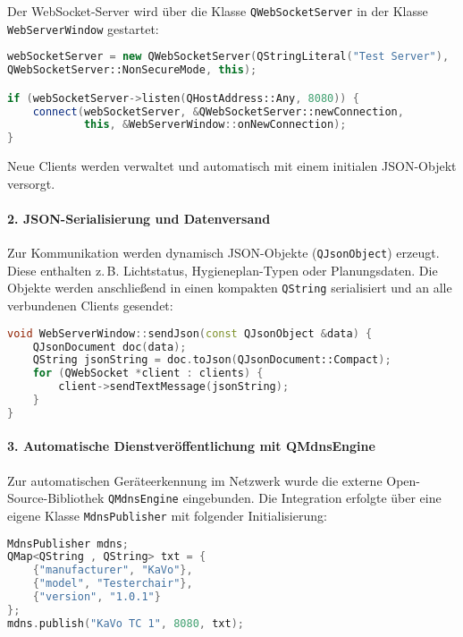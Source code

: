 Der WebSocket-Server wird über die Klasse \texttt{QWebSocketServer} in der Klasse \texttt{WebServerWindow} gestartet:

\begin{lstlisting}[language=C++,caption={Starten des WebSocket-Servers},label={lst:websocket-server}]
webSocketServer = new QWebSocketServer(QStringLiteral("Test Server"),
QWebSocketServer::NonSecureMode, this);

if (webSocketServer->listen(QHostAddress::Any, 8080)) {
    connect(webSocketServer, &QWebSocketServer::newConnection,
            this, &WebServerWindow::onNewConnection);
}
\end{lstlisting}

Neue Clients werden verwaltet und automatisch mit einem initialen JSON-Objekt versorgt.

\vspace{1em}
\paragraph{2. JSON-Serialisierung und Datenversand}

Zur Kommunikation werden dynamisch JSON-Objekte (\texttt{QJsonObject}) erzeugt. Diese enthalten z.\,B. Lichtstatus, Hygieneplan-Typen oder Planungsdaten. Die Objekte werden anschließend in einen kompakten \texttt{QString} serialisiert und an alle verbundenen Clients gesendet:

\begin{lstlisting}[language=C++,caption={JSON-Objekt senden},label={lst:send-json}]
void WebServerWindow::sendJson(const QJsonObject &data) {
    QJsonDocument doc(data);
    QString jsonString = doc.toJson(QJsonDocument::Compact);
    for (QWebSocket *client : clients) {
        client->sendTextMessage(jsonString);
    }
}
\end{lstlisting}

\vspace{1em}
\paragraph{3. Automatische Dienstveröffentlichung mit QMdnsEngine}

Zur automatischen Geräteerkennung im Netzwerk wurde die externe Open-Source-Bibliothek \texttt{QMdnsEngine} eingebunden. Die Integration erfolgte über eine eigene Klasse \texttt{MdnsPublisher} mit folgender Initialisierung:

\begin{lstlisting}[language=C++,caption={Veröffentlichen eines mDNS-Dienstes},label={lst:qmdns-publish}]
MdnsPublisher mdns;
QMap<QString , QString> txt = {
    {"manufacturer", "KaVo"},
    {"model", "Testerchair"},
    {"version", "1.0.1"}
};
mdns.publish("KaVo TC 1", 8080, txt);
\end{lstlisting}

